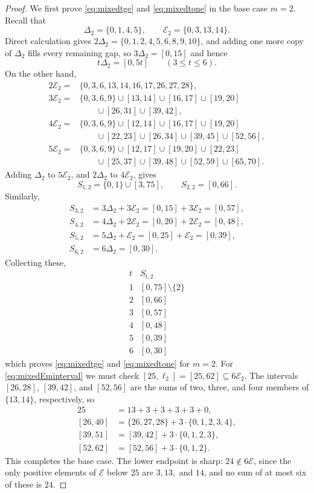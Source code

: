 \documentclass[12pt]{article}
\theoremstyle{plain}
\begin{document}
\begin{proof}
We first prove \eqref{eq:mixedtge} and \eqref{eq:mixedtone} in the base
case $m=2$.  Recall that
\[
 \Delta_2=\{0,1,4,5\},\qquad \mathcal E_2=\{0,3,13,14\}.
\]
Direct calculation gives $2\Delta_2=\{0,1,2,4,5,6,8,9,10\}$, and adding one
more copy of $\Delta_2$ fills every remaining gap, so $3\Delta_2=[0,15]$ and hence
\[
 t\Delta_2=[0,5t]\qquad(3\leq t\leq6).
\]
On the other hand,
\[
\begin{aligned}
2\mathcal E_2
={}&\{0,3,6,13,14,16,17,26,27,28\},\\[1ex]
3\mathcal E_2
={}&\{0,3,6,9\}\cup[13,14]\cup[16,17]\cup[19,20]\\
&\qquad\cup[26,31]\cup[39,42],\\[1ex]
4\mathcal E_2
={}&\{0,3,6,9\}\cup[12,14]\cup[16,17]\cup[19,20]\\
&\qquad\cup[22,23]\cup[26,34]\cup[39,45]\cup[52,56],\\[1ex]
5\mathcal E_2
={}&\{0,3,6,9\}\cup[12,17]\cup[19,20]\cup[22,23]\\
&\qquad\cup[25,37]\cup[39,48]\cup[52,59]\cup[65,70].
\end{aligned}
\]
Adding $\Delta_2$ to $5\mathcal E_2$, and $2\Delta_2$ to $4\mathcal E_2$, gives
\[
 S_{1,2}=\{0,1\}\cup[3,75],\qquad S_{2,2}=[0,66].
\]
Similarly,
\[
\begin{aligned}
S_{3,2}&=3\Delta_2+3\mathcal E_2=[0,15]+3\mathcal E_2=[0,57],\\[1ex]
S_{4,2}&=4\Delta_2+2\mathcal E_2=[0,20]+2\mathcal E_2=[0,48],\\[1ex]
S_{5,2}&=5\Delta_2+\mathcal E_2 =[0,25]+\mathcal E_2 =[0,39],\\[1ex]
S_{6,2}&=6\Delta_2=[0,30].
\end{aligned}
\]
Collecting these,
\[
\begin{array}{c|c}
t&S_{t,2}\\ \hline
1&[0,75]\setminus\{2\}\\
2&[0,66]\\
3&[0,57]\\
4&[0,48]\\
5&[0,39]\\
6&[0,30]
\end{array}
\]
which proves \eqref{eq:mixedtge} and \eqref{eq:mixedtone} for $m=2$.
For \eqref{eq:mixedEminterval} we must check
$[25,\ell_2]=[25,62]\subseteq6\mathcal E_2$.  The intervals $[26,28]$,
$[39,42]$, and $[52,56]$ are the sums of two, three, and four members of
$\{13,14\}$, respectively, so
\[
\begin{aligned}
25&=13+3+3+3+3+0,\\
[26,40]&=\{26,27,28\}+3\cdot\{0,1,2,3,4\},\\
[39,51]&=[39,42]+3\cdot\{0,1,2,3\},\\
[52,62]&=[52,56]+3\cdot\{0,1,2\}.
\end{aligned}
\]
This completes the base case.  The lower endpoint is sharp:
$24\notin6\mathcal E$, since the only positive elements of $\mathcal E$
below $25$ are $3,13,$ and $14$, and no sum of at most six of these is
$24$.


\end{proof}
\end{document}
